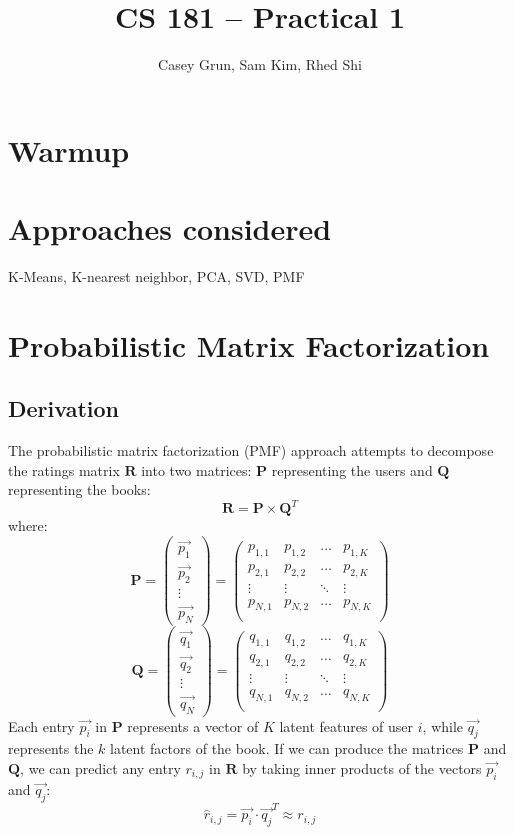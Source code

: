 \documentclass[11pt]{amsart}
\title{CS 181 -- Practical 1}
\author{Casey Grun, Sam Kim, Rhed Shi}
\newcommand{\mat}[1]{\mathbf{#1}}
\begin{document}
\maketitle

\section{Warmup}

\section{Approaches considered}
K-Means, K-nearest neighbor, PCA, SVD, PMF

\section{Probabilistic Matrix Factorization}
\subsection{Derivation}
The probabilistic matrix factorization (PMF) approach \cite{Mnih:2007wg} attempts to decompose the ratings matrix $\mat{R}$ into two matrices: $\mat{P}$ representing the users and $\mat{Q}$ representing the books:
$$\mat{R} = \mat{P} \times \mat{Q}^T$$
where:
$$ 
\mat{P} = 
\begin{pmatrix}
	\vec{p_1} \\
	\vec{p_2} \\
	\vdots    \\
	\vec{p_N} 
\end{pmatrix} = 
\begin{pmatrix}
	p_{1,1} & p_{1,2} & \ldots & p_{1,K} \\
	p_{2,1} & p_{2,2} & \ldots & p_{2,K} \\
	\vdots  & \vdots  & \ddots & \vdots  \\
	p_{N,1} & p_{N,2} & \ldots & p_{N,K} \\
\end{pmatrix}
$$
$$ 
\mat{Q} = 
\begin{pmatrix}
	\vec{q_1} \\
	\vec{q_2} \\
	\vdots    \\
	\vec{q_N} 
\end{pmatrix} = 
\begin{pmatrix}
	q_{1,1} & q_{1,2} & \ldots & q_{1,K} \\
	q_{2,1} & q_{2,2} & \ldots & q_{2,K} \\
	\vdots  & \vdots  & \ddots & \vdots  \\
	q_{N,1} & q_{N,2} & \ldots & q_{N,K} \\
\end{pmatrix}
$$
Each entry $\vec{p_i}$ in $\mat{P}$ represents a vector of $K$ latent features of user $i$, while $\vec{q_j}$ represents the $k$ latent factors of the book. If we can produce the matrices $\mat{P}$ and $\mat{Q}$, we can predict any entry $r_{i,j}$ in $\mat{R}$ by taking inner products of the vectors $\vec{p_i}$ and $\vec{q_j}$:
$$\hat{r}_{i,j} = \vec{p_i} \cdot \vec{q_j}^T \approx r_{i,j}$$
\end{document}
